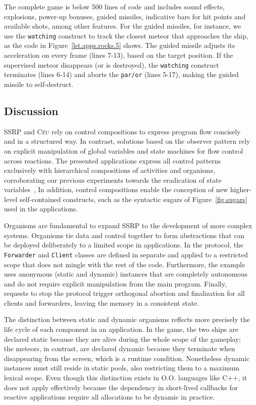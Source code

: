 \documentclass[preprint]{sigplanconf}
\newcommand{\CEU}{\textsc{C\'{e}u}\xspace}
\newcommand{\code}[1] {{\small{\texttt{#1}}}}
\newcommand{\1}{\;}
\newcommand{\2}{\;\;}
\newcommand{\3}{\;\;\;}
\newcommand{\5}{\;\;\;\;\;}
\begin{document}
The complete game is below 500 lines of code and includes sound effects, 
explosions, power-up bonuses, guided missiles, indicative bars for hit points 
and available shots, among other features.
%
For the guided missiles, for instance, we use the \code{watching} construct to 
track the closest meteor that approaches the ship, as the code in 
Figure~\ref{lst.apps.rocks.5} shows.
The guided missile adjusts its acceleration on every frame (lines 7-13), based 
on the target position.
%
If the supervised meteor disappears (or is destroyed), the \code{watching} 
construct terminates (lines 6-14) and aborts the \code{par/or} (lines 5-17), 
making the guided missile to self-destruct.

\subsection{Discussion}

SSRP and \CEU rely on control compositions to express program flow concisely 
and in a structured way.
%
In contrast, solutions based on the observer pattern rely on explicit 
manipulation of global variables and state machines for flow control across 
reactions.
%
The presented applications express all control patterns exclusively with 
hierarchical compositions of activities and organisms, corroborating our 
previous experiments towards the eradication of state 
variables~\cite{ceu.sensys13},
%
In addition, control compositions enable the conception of new higher-level 
self-contained constructs, such as the syntactic sugars of 
Figure~\ref{fig.sugars} used in the applications.

Organisms are fundamental to expand SSRP to the development of more complex 
systems.
%
Organisms tie data and control together to form abstractions that can be 
deployed deliberately to a limited scope in applications.
%
In the protocol, the \code{Forwarder} and \code{Client} classes are defined in 
separate and applied to a restricted scope that does not mingle with the rest 
of the code.
%
Furthermore, the example uses anonymous (static and dynamic) instances that are 
completely autonomous and do not require explicit manipulation from the main 
program.
%
Finally, requests to stop the protocol trigger orthogonal abortion and 
finalization for all clients and forwarders, leaving the memory in a consistent 
state.
%

The distinction between static and dynamic organisms reflects more precisely 
the life cycle of each component in an application.
%
In the game, the two ships are declared static because they are alive during 
the whole scope of the gameplay; the meteors, in contrast, are declared dynamic 
because they terminate when disappearing from the screen, which is a runtime 
condition.
Nonetheless dynamic instances must still reside in static pools, also 
restricting them to a maximum lexical scope.
%
Even though this distinction exists in O.O. languages like C++, it does not 
apply effectively because the dependency in short-lived callbacks for reactive 
applications require all allocations to be dynamic in practice.
\end{document}
